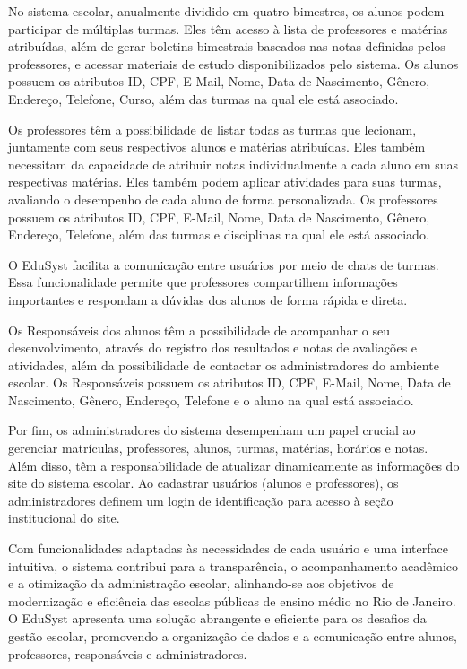 \documentclass[main.tex]{subfiles}
\begin{document}
No sistema escolar, anualmente dividido em quatro bimestres, os alunos podem participar de múltiplas turmas. Eles têm acesso à lista de professores e matérias atribuídas, além de gerar boletins bimestrais baseados nas notas definidas pelos professores, e acessar materiais de estudo disponibilizados pelo sistema. Os alunos possuem os atributos ID, CPF, E-Mail, Nome, Data de Nascimento, Gênero, Endereço, Telefone, Curso, além das turmas na qual ele está associado.

Os professores têm a possibilidade de listar todas as turmas que lecionam, juntamente com seus respectivos alunos e matérias atribuídas. Eles também necessitam da capacidade de atribuir notas individualmente a cada aluno em suas respectivas matérias. Eles também podem aplicar atividades para suas turmas, avaliando o desempenho de cada aluno de forma personalizada. Os professores possuem os atributos ID, CPF, E-Mail, Nome, Data de Nascimento, Gênero, Endereço, Telefone, além das turmas e disciplinas na qual ele está associado.

O EduSyst facilita a comunicação entre usuários por meio de chats de turmas. Essa funcionalidade permite que professores compartilhem informações importantes e respondam a dúvidas dos alunos de forma rápida e direta.

Os Responsáveis dos alunos têm a possibilidade de acompanhar o seu desenvolvimento, através do registro dos resultados e notas de avaliações e atividades, além da possibilidade de contactar os administradores do ambiente escolar. Os Responsáveis possuem os atributos ID, CPF, E-Mail, Nome, Data de Nascimento, Gênero, Endereço, Telefone e o aluno na qual está associado.

Por fim, os administradores do sistema desempenham um papel crucial ao gerenciar matrículas, professores, alunos, turmas, matérias, horários e notas. Além disso, têm a responsabilidade de atualizar dinamicamente as informações do site do sistema escolar. Ao cadastrar usuários (alunos e professores), os administradores definem um login de identificação para acesso à seção institucional do site.

Com funcionalidades adaptadas às necessidades de cada usuário e uma interface intuitiva, o sistema contribui para a transparência, o acompanhamento acadêmico e a otimização da administração escolar, alinhando-se aos objetivos de modernização e eficiência das escolas públicas de ensino médio no Rio de Janeiro. O EduSyst apresenta uma solução abrangente e eficiente para os desafios da gestão escolar, promovendo a organização de dados e a comunicação entre alunos, professores, responsáveis e administradores.
\end{document}

